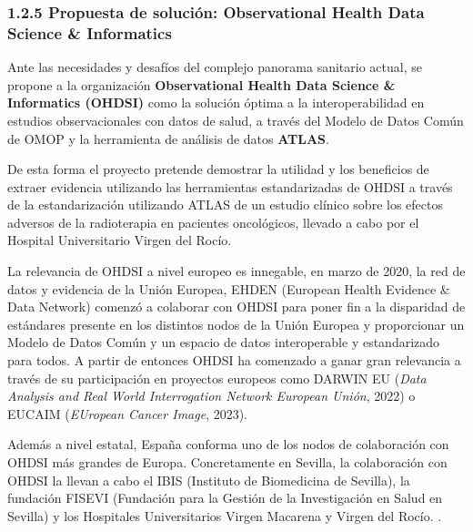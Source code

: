 \subsubsection{1.2.5 Propuesta de solución: Observational Health Data Science \& Informatics}

Ante las necesidades y desafíos del complejo panorama sanitario actual, se propone a la organización \textbf{Observational Health Data Science \& Informatics (OHDSI)} como la solución óptima a la interoperabilidad en estudios observacionales con datos de salud, a través del Modelo de Datos Común de OMOP y la herramienta de análisis de datos \textbf{ATLAS}. 

De esta forma el proyecto pretende demostrar la utilidad y los beneficios de extraer evidencia utilizando las herramientas estandarizadas de OHDSI a través de la estandarización utilizando ATLAS de un estudio clínico sobre los efectos adversos de la radioterapia en pacientes oncológicos, llevado a cabo por el Hospital Universitario Virgen del Rocío.

La relevancia de OHDSI a nivel europeo es innegable, en marzo de 2020, la red de datos y evidencia de la Unión Europea, EHDEN (European Health Evidence \& Data Network) comenzó a colaborar con OHDSI para poner fin a la disparidad de estándares presente en los distintos nodos de la Unión Europea y proporcionar un Modelo de Datos Común y un espacio de datos interoperable y estandarizado para todos. A partir de entonces OHDSI ha comenzado a ganar gran relevancia a través de su participación en proyectos europeos como DARWIN EU (\textit{Data Analysis and Real World Interrogation Network European Unión}, 2022) \cite{OHDSI2023Darwin} %
o EUCAIM (\textit{EUropean Cancer Image}, 2023).%

Además a nivel estatal, España conforma uno de los nodos de colaboración con OHDSI más grandes de Europa. %
Concretamente en Sevilla, la colaboración con OHDSI la llevan a cabo el IBIS (Instituto de Biomedicina de Sevilla), la fundación FISEVI (Fundación para la Gestión de la Investigación en Salud en Sevilla) y los Hospitales Universitarios Virgen Macarena y Virgen del Rocío. . %



